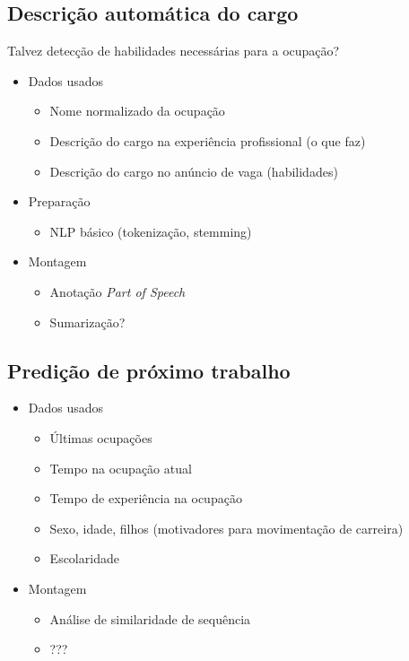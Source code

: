 \documentclass[12pt,a4paper]{article}
\begin{document}
\subsection{Descrição automática do cargo}

Talvez detecção de habilidades necessárias para a ocupação?

\begin{itemize}
\item Dados usados
	\begin{itemize}
    \item Nome normalizado da ocupação
	\item Descrição do cargo na experiência profissional (o que faz)
    \item Descrição do cargo no anúncio de vaga (habilidades)
	\end{itemize}
\item Preparação
	\begin{itemize}
	\item NLP básico (tokenização, stemming)
	\end{itemize}
\item Montagem
	\begin{itemize}
	\item Anotação \textit{Part of Speech}
	\item Sumarização?
	\end{itemize}
\end{itemize}

\subsection{Predição de próximo trabalho}

\begin{itemize}
\item Dados usados
	\begin{itemize}
    \item Últimas ocupações
    \item Tempo na ocupação atual
    \item Tempo de experiência na ocupação
	\item Sexo, idade, filhos (motivadores para movimentação de carreira)
    \item Escolaridade
	\end{itemize}
\item Montagem
	\begin{itemize}
	\item Análise de similaridade de sequência
    \item ???
	\end{itemize}
\end{itemize}
\end{document}
